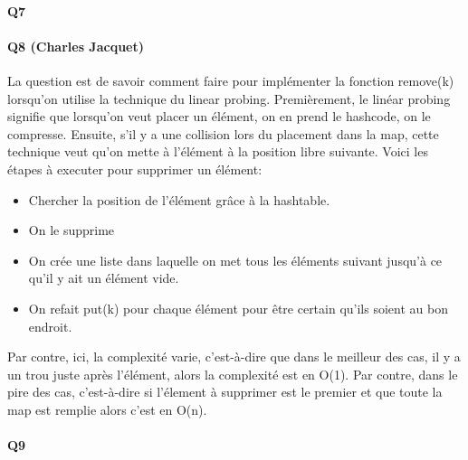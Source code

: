 \documentclass[a4paper]{article}
\begin{document}
\paragraph{Q7}

\paragraph{Q8 (Charles Jacquet)}
La question est de savoir comment faire pour implémenter la fonction remove(k) lorsqu'on utilise la technique du linear probing. Premièrement, le linéar probing signifie que lorsqu'on veut placer un élément, on en prend le hashcode, on le compresse. Ensuite, s'il y a une collision lors du placement dans la map, cette technique veut qu'on mette à l'élément à la position libre suivante. Voici les étapes à executer pour supprimer un élément:
\begin{itemize}
\item Chercher la position de l'élément grâce à la hashtable.
\item On le supprime
\item On crée une liste dans laquelle on met tous les éléments suivant jusqu'à ce qu'il y ait un élément vide.
\item On refait put(k) pour chaque élément pour être certain qu'ils soient au bon endroit.
\end{itemize}

Par contre, ici, la complexité varie, c'est-à-dire que dans le meilleur des cas, il y a un trou juste après l'élément, alors la complexité est en O(1). Par contre, dans le pire des cas, c'est-à-dire si l'élement à supprimer est le premier et que toute la map est remplie alors c'est en O(n).

\paragraph{Q9}
\end{document}
